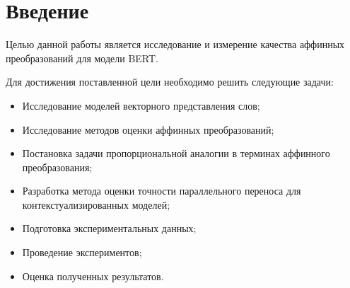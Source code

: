 \documentclass[a4paper,14pt]{article}
\begin{document}
	 
	
	\tableofcontents
	
	\pagebreak
	
	
	
	
	
	
	
	
	
	\section{Введение}
	
	Целью данной работы является исследование и измерение качества аффинных преобразований для модели BERT.
	
	Для достижения поставленной цели необходимо решить следующие задачи:
	
	\begin{itemize}
	
		\item Исследование моделей векторного представления слов;
		
		\item Исследование методов оценки аффинных преобразований;
		
		\item Постановка задачи пропорциональной аналогии в терминах аффинного преобразования;
		
		\item Разработка метода оценки точности параллельного переноса для контекстуализированных моделей;
		
		\item Подготовка экспериментальных данных;
		
		\item Проведение экспериментов;
		
		\item Оценка полученных результатов.
		
	\end{itemize}
\end{document}
